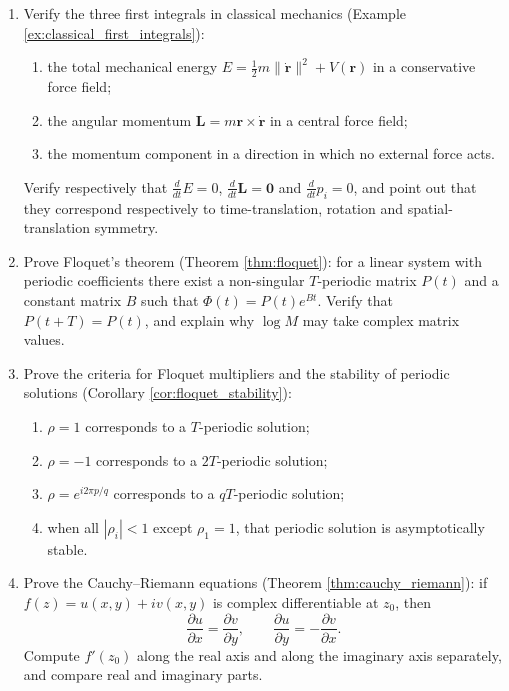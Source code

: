 \begin{enumerate}[leftmargin=3em, label=\textbf{Exercise \arabic*}]
    \item Verify the three first integrals in classical mechanics (Example \ref{ex:classical_first_integrals}):
    \begin{enumerate}[label=(\roman*)]
        \item the total mechanical energy $E=\frac12m\|\dot{\mathbf{r}}\|^2+V(\mathbf{r})$ in a conservative force field;
        \item the angular momentum $\mathbf{L}=m\mathbf{r}\times\dot{\mathbf{r}}$ in a central force field;
        \item the momentum component in a direction in which no external force acts.
    \end{enumerate}
    Verify respectively that $\frac{d}{dt}E=0$, $\frac{d}{dt}\mathbf{L}=\mathbf{0}$ and $\frac{d}{dt}p_i=0$,
    and point out that they correspond respectively to time-translation, rotation and spatial-translation symmetry.

    \item Prove Floquet's theorem (Theorem \ref{thm:floquet}):
    for a linear system with periodic coefficients there exist a non-singular $T$-periodic matrix $P(t)$ and a constant matrix $B$
    such that $\Phi(t)=P(t)e^{Bt}$.
    Verify that $P(t+T)=P(t)$, and explain why $\log M$ may take complex matrix values.

    \item Prove the criteria for Floquet multipliers and the stability of periodic solutions (Corollary \ref{cor:floquet_stability}):
    \begin{enumerate}[label=(\roman*)]
        \item $\rho=1$ corresponds to a $T$-periodic solution;
        \item $\rho=-1$ corresponds to a $2T$-periodic solution;
        \item $\rho=e^{i2\pi p/q}$ corresponds to a $qT$-periodic solution;
        \item when all $|\rho_i|<1$ except $\rho_1=1$, that periodic solution is asymptotically stable.
    \end{enumerate}

    \item Prove the Cauchy--Riemann equations (Theorem \ref{thm:cauchy_riemann}):
    if $f(z)=u(x,y)+iv(x,y)$ is complex differentiable at $z_0$, then
    \[
    \frac{\partial u}{\partial x}=\frac{\partial v}{\partial y},\qquad
    \frac{\partial u}{\partial y}=-\frac{\partial v}{\partial x}.
    \]
    Compute $f'(z_0)$ along the real axis and along the imaginary axis separately, and compare real and imaginary parts.


\end{enumerate}
